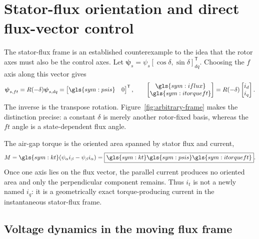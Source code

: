 \section{Stator-flux orientation and direct flux-vector control}
\label{sec:flux-oriented-frames}

The stator-flux frame is an established counterexample to the idea that the
rotor axes must also be the control axes. Let
\(\boldsymbol\psi_s=\psi_s[\cos\delta,\sin\delta]^{\mathsf T}_{dq}\).
Choosing the \(f\) axis along this vector gives
\[
 \boldsymbol\psi_{s,ft}=R(-\delta)\boldsymbol\psi_{s,dq}
 =\begin{bmatrix}\gls{sym:psis}&0\end{bmatrix}^{\mathsf T},\qquad
 \begin{bmatrix}\gls{sym:iflux}\\\gls{sym:itorqueft}\end{bmatrix}
 =R(-\delta)\begin{bmatrix}i_d\\i_q\end{bmatrix}.
\]
The inverse is the transpose rotation. Figure~\ref{fig:arbitrary-frame} makes
the distinction precise: a constant \(\delta\) is merely another rotor-fixed
basis, whereas the \(ft\) angle is a state-dependent flux angle.



The air-gap torque is the oriented area spanned by stator flux and current,
\begin{equation}
 M=\gls{sym:kt}(\psi_\alpha i_\beta-\psi_\beta i_\alpha)
 =\boxed{\gls{sym:kt}\gls{sym:psis}\gls{sym:itorqueft}}.
 \label{eq:ft-torque}
\end{equation}
Once one axis lies on the flux vector, the parallel current produces no
oriented area and only the perpendicular component remains. Thus \(i_t\) is
not a newly named \(i_q\): it is a geometrically exact torque-producing
current in the instantaneous stator-flux frame.




\subsection{Voltage dynamics in the moving flux frame}

